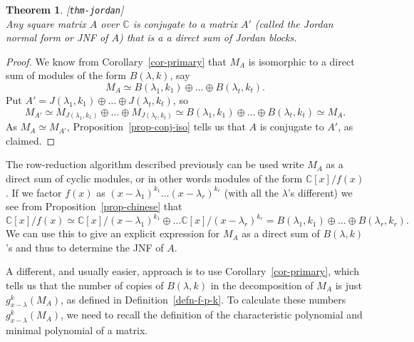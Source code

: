 \documentclass{amsart}
\newcommand{\lbl}[1]{\label{#1}\textup{[\texttt{#1}]}\ \\}
\newcommand{\lbl}{\label}
\newcommand{\C}         {{\mathbb{C}}}
\newcommand{\lm}        {\lambda}
\newcommand{\op}        {\oplus}
\renewcommand{\:}{\colon}
\newtheorem{theorem}{Theorem}[section]
\theoremstyle{definition}
\begin{document}
\begin{theorem}\lbl{thm-jordan}
 Any square matrix $A$ over $\C$ is conjugate to a matrix $A'$ (called
 the \emph{Jordan normal form} or \emph{JNF} of $A$) that is a a
 direct sum of Jordan blocks.
\end{theorem}
\begin{proof}
 We know from Corollary~\ref{cor-primary} that $M_A$ is isomorphic to
 a direct sum of modules of the form $B(\lm,k)$, say
 \[ M_A\simeq B(\lm_1,k_1)\op\ldots\op B(\lm_t,k_t). \]
 Put $A'=J(\lm_1,k_1)\op\ldots\op J(\lm_t,k_t)$, so
 \[ M_{A'}\simeq M_{J(\lm_1,k_1)}\op\ldots\op M_{J(\lm_t,k_t)}
          \simeq B(\lm_1,k_1)\op\ldots\op B(\lm_t,k_t)\simeq M_A.
 \]
 As $M_A\simeq M_{A'}$, Proposition~\ref{prop-conj-iso} tells us that
 $A$ is conjugate to $A'$, as claimed.
\end{proof}

The row-reduction algorithm described previously can be used write
$M_A$ as a direct sum of cyclic modules, or in other words modules of
the form $\C[x]/f(x)$.  If we factor $f(x)$ as
$(x-\lm_1)^{k_1}\ldots(x-\lm_r)^{k_r}$ (with all the $\lm$'s
different) we see from Proposition~\ref{prop-chinese} that
\[ \C[x]/f(x) \simeq
   \C[x]/(x-\lm_1)^{k_1} \op \ldots \C[x]/(x-\lm_r)^{k_r} =
   B(\lm_1,k_1) \op \ldots \op B(\lm_r,k_r).
\]
We can use this to give an explicit expression for $M_A$ as a direct
sum of $B(\lm,k)$'s and thus to determine the JNF of $A$.

A different, and usually easier, approach is to use
Corollary~\ref{cor-primary}, which tells us that the number of copies
of $B(\lm,k)$ in the decomposition of $M_A$ is just
$g_{x-\lm}^k(M_A)$, as defined in Definition~\ref{defn-f-p-k}.  To
calculate these numbers $g_{x-\lm}^k(M_A)$, we need to recall the
definition of the characteristic polynomial and minimal polynomial of
a matrix.
\end{document}
